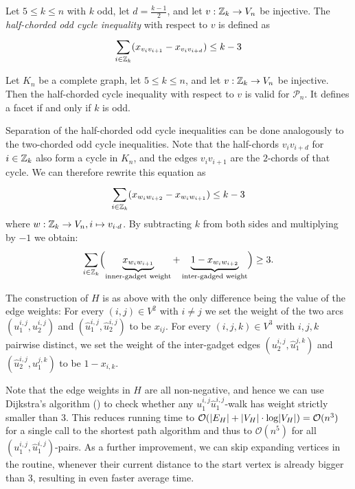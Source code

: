 \begin{definition}\label{def:half-chorded}
	Let $5 \leq k \leq n$ with $k$ odd, let $d = \frac{k-1}{2}$, and let $v: \mathbb{Z}_{k} \to V_{n}$ be injective.
	The \textit{half-chorded odd cycle inequality} with respect to $v$ is defined as
	\begin{equation}\label{eq:half-chorded}
		\sum_{i \in \mathbb{Z}_{k}}^{} (x_{v_{i} v_{i+1}} - x_{v_{i} v_{i+d} }) \leq k - 3
	\end{equation}
\end{definition}
\begin{theorem}
	Let $K_{n}$ be a complete graph, let $5 \leq k \leq n$, and let $v: \mathbb{Z}_{k} \to V_{n}$ be injective.
	Then the half-chorded cycle inequality with respect to $v$ is valid for $\mathscr{P}_{n}$.
	It defines a facet if and only if $k$ is odd.
\end{theorem}
Separation of the half-chorded odd cycle inequalities can be done analogously to the two-chorded odd cycle inequalities. 
Note that the half-chords $v_{i}v_{i+d}$ for $i \in \mathbb{Z}_{k}$ also form a cycle in $K_{n}$, and the edges $v_{i}v_{i+1}$ are the $2$-chords of that cycle.
We can therefore rewrite this equation as
\begin{equation*}
\sum_{i \in \mathbb{Z}_{k}}^{} (x_{w_{i}w_{i+2}} - x_{w_{i}w_{i+1}}) \leq k-3
\end{equation*}
where $w: \mathbb{Z}_{k} \to V_{n}, i \mapsto v_{i \cdot d}$.
By subtracting $k$ from both sides and multiplying by $-1$ we obtain:
\begin{equation*}
	\sum_{i \in \mathbb{Z}_{k}}^{} \Bigl( \underbrace{x_{w_{i}w_{i+1}}}_{\text{inner-gadget weight}} + \underbrace{1 -x_{w_{i}w_{i+2}}}_{\text{inter-gadged weight}} \Bigr) \geq 3.
\end{equation*}

The construction of $H$ is as above with the only difference being the value of the edge weights:
For every $(i,j) \in V^{2}$ with $i \neq j$ we set the weight of the two arcs $(u_{1}^{i,j},u_{2}^{i,j})$ and $(\hat{u}_{1}^{i,j},\hat{u}_{2}^{i,j})$ to be $x_{ij}$.
For every $(i,j,k) \in V^{3}$ with $i,j,k$ pairwise distinct, we set the weight of the inter-gadget edges $(u_{2}^{i,j},\hat{u}_{1}^{j,k})$ and $(\hat{u}_{2}^{i,j}, u_{1}^{j,k})$ to be $1 - x_{i,k}$.

Note that the edge weights in $H$ are all non-negative, and hence we can use Dijkstra’s algorithm (\cite{dijkstraNoteTwoProblems1959}) to check whether any $u_{1}^{i,j}\hat{u}_{1}^{i,j}$-walk has weight strictly smaller than $3$.
This reduces running time to $\mathcal{O}(\lvert E_{H} \rvert + \lvert V_{H} \rvert \cdot\operatorname{\text{log}} \lvert V_{H} \rvert) = \mathcal{O}(n^{3})$ for a single call to the shortest path algorithm and thus to $\mathcal{O}(n^{5})$ for all $(u_{1}^{i,j}, \hat{u}_{1}^{i,j})$-pairs.
As a further improvement, we can skip expanding vertices in the routine, whenever their current distance to the start vertex is already bigger than $3$, resulting in even faster average time.
